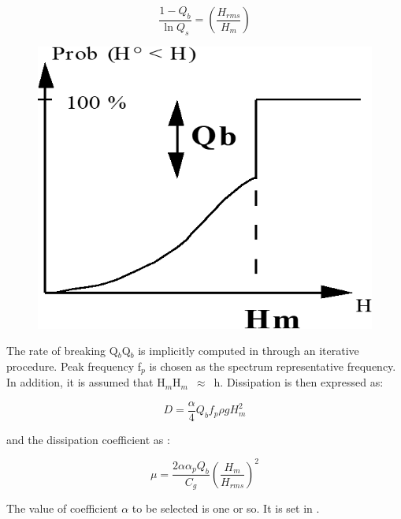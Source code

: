     \begin{minipage}[b]{0.4\textwidth}
      \[ \frac{1-Q_{b}}{\ln Q_{s}} = \left( \frac{H_{rms}}{H_{m}}\right)\]

    \end{minipage}%
    \begin{minipage}[b]{0.4\textwidth}
      \begin{figure}[H]%
        \centering
        \includegraphics[width=\textwidth]{./graphics/wave_prob}
      \end{figure}
    \end{minipage}%

The rate of breaking Q${}_{b}$Q${}_{b}$ is implicitly computed in \artemis{}
through an iterative procedure. Peak frequency f${}_{p}$ is chosen as the
spectrum representative frequency. In addition, it is assumed that
H${}_{m}$H${}_{m}$~$\mathrm{\approx}$~h. Dissipation is then expressed as:

\begin{equation}
  D = \frac{\alpha}{4} Q_b f_p \rho gH_m^2
  \label{eq:3.47}
\end{equation}

and the dissipation coefficient as :

\begin{equation}
  \mu = \frac{2\alpha\alpha_pQ_b}{C_g}\left(\frac{H_m}{H_{rms}}\right)^2
  \label{eq:3.47}
\end{equation}

The value of coefficient $\alpha$ to be selected is one or so. It is set in \artemis{}.


